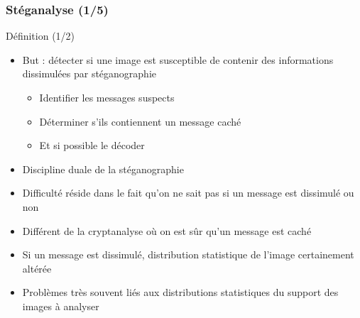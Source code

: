 \documentclass{beamer}
\begin{document}
	\begin{frame}
	\frametitle{Stéganalyse  (1/5)}
	\begin{alertblock}{Définition (1/2)}
   	\rightskip=0pt\leftskip=0pt
	\begin{itemize}
	 	\item But : détecter si une image est susceptible de contenir des informations dissimulées par stéganographie
	 		\begin{itemize}
	 		\item Identifier les messages suspects
	 		\item Déterminer s'ils contiennent un message caché
	 		\item Et si possible le décoder
	 		\end{itemize}
	 	\item Discipline duale de la stéganographie
	 	\item Difficulté réside dans le fait qu'on ne sait pas si un message est dissimulé ou non
	 	\item Différent de la cryptanalyse où on est sûr qu'un message est caché
	 	\item Si un message est dissimulé, distribution statistique de l'image certainement altérée
	 	\item Problèmes très souvent liés aux distributions statistiques du support des images à analyser
	\end{itemize}
	\end{alertblock}
	\end{frame}
	
\end{document}
